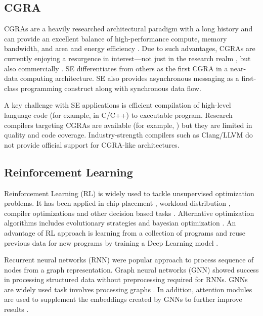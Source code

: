 \subsection{CGRA}
CGRAs are a heavily researched architectural paradigm with a long history and can provide an excellent balance of high-performance compute, memory bandwidth, and area and energy efficiency \cite{theodoridis2007survey}.
Due to such advantages, CGRAs are currently enjoying a resurgence in interest—not just in the research realm \cite{prabhakar2018plasticine}, but also commercially \cite{morgan2018intel, nicol2017coarse, vissers2019versal}.
SE differentiates from others as the first CGRA in a near-data computing architecture.
SE also provides asynchronous messaging as a first-class programming construct along with synchronous data flow. 

A key challenge with SE applications is efficient compilation of high-level language code (for example, in C/C++) to executable program. 
Research compilers targeting CGRAs are available (for example, \cite{adriaansen2016code, chin2017cgra, mei2003exploiting, prabhakar2018plasticine}) but they are limited in quality and code coverage. 
Industry-strength compilers such as Clang/LLVM do not provide official support for CGRA-like architectures.
\subsection{Reinforcement Learning}
Reinforcement Learning (RL) is widely used to tackle unsupervised optimization problems. It has been applied in chip placement \cite{mirhoseini2020chip}, 
workload distribution \cite{Mirhoseini_placementRNN, addanki2019placeto, zhou2019gdp}, compiler optimizations \cite{Zhou_compileGNN} and 
other decision based tasks \cite{kormushev2013reinforcement, ZophL16_NASRL}. Alternative optimization algorithms includes 
evolutionary strategies \cite{Zhichao_ESNAS} and bayesian optimization \cite{shi2020learned}. An advantage of RL approach is learning from 
a collection of programs and reuse previous data for new programs by training a Deep Learning model \cite{zhou2019gdp}.

Recurrent neural networks (RNN) \cite{hochreiter1996lstm} were popular approach to process sequence of nodes from a graph representation. 
Graph neural networks (GNN) \cite{gori2005new} showed success in processing structured data without preprocessing required for RNNs.
GNNs are widely used task involves processing graphs \cite{Zhou_compileGNN, zhou2019gdp}. 
In addition, attention modules are used to 
supplement the embeddings created by GNNs to further improve results \cite{addanki2019placeto}.

